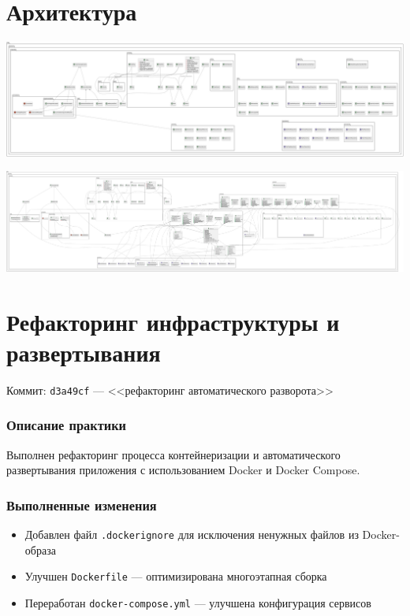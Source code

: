 \documentclass{article}
\begin{document}
\section{Архитектура}

\begin{center}
  \includegraphics[width=.9\textwidth]{dia1}
\end{center}

\begin{center}
  \includegraphics[width=.9\textwidth]{dia2}
\end{center}

\section{Рефакторинг инфраструктуры и развертывания}

Коммит: \texttt{d3a49cf} --- <<рефакторинг автоматического разворота>>

\subsubsection{Описание практики}
Выполнен рефакторинг процесса контейнеризации и автоматического развертывания приложения с использованием Docker и Docker Compose.
\subsubsection{Выполненные изменения}
\begin{itemize}
\item Добавлен файл \texttt{.dockerignore} для исключения ненужных файлов из Docker-образа
\item Улучшен \texttt{Dockerfile} --- оптимизирована многоэтапная сборка
\item Переработан \texttt{docker-compose.yml} --- улучшена конфигурация сервисов
\end{itemize}
\end{document}
